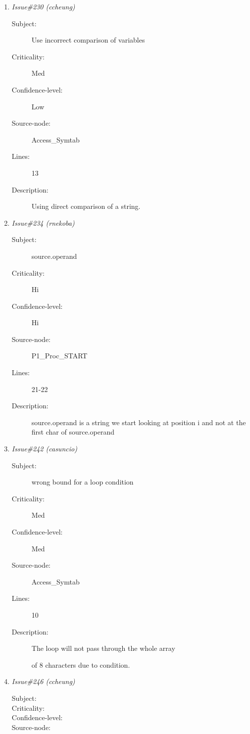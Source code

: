 \begin{enumerate}
\begin{description}
\item [Lines:] 16

\item [Description:] No parantheses to prevent invalid order of
precedence operation.
\end{description}
\item {\it Issue\#230 (ccheung)}
\begin{description}
\item [Subject:] Use incorrect comparison of variables
\item [Criticality:] Med
\item [Confidence-level:] Low
\item [Source-node:] Access\_Symtab

\item [Lines:] 13

\item [Description:] Using direct comparison of a string.
\end{description}
\item {\it Issue\#234 (rnekoba)}
\begin{description}
\item [Subject:] source.operand
\item [Criticality:] Hi
\item [Confidence-level:] Hi
\item [Source-node:] P1\_Proc\_START

\item [Lines:] 21-22

\item [Description:] source.operand is a string we start looking at
position i and not at the first char of source.operand
\end{description}
\item {\it Issue\#242 (casuncio)}
\begin{description}
\item [Subject:] wrong bound for a loop condition
\item [Criticality:] Med
\item [Confidence-level:] Med
\item [Source-node:] Access\_Symtab

\item [Lines:] 10

\item [Description:] The loop will not pass through the whole array

of 8 characters due to condition.
\end{description}
\item {\it Issue\#246 (ccheung)}
\begin{description}
\item [Subject:] 
\item [Criticality:] 
\item [Confidence-level:] 
\item [Source-node:] 


\end{description}
\end{enumerate}
